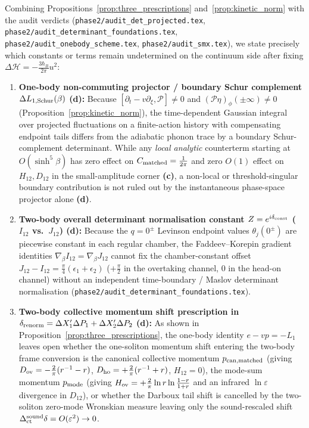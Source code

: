 \documentclass[11pt,a4paper]{article}
\newcommand{\Lc}{\textbf{(c)}}
\newcommand{\Ld}{\textbf{(d)}}
\begin{document}
Combining Propositions~\ref{prop:three_prescriptions} and~\ref{prop:kinetic_norm} with the audit verdicts (\texttt{phase2/audit\_det\_projected.tex}, \texttt{phase2/audit\_determinant\_foundations.tex}, \texttt{phase2/audit\_onebody\_scheme.tex}, \texttt{phase2/audit\_smx.tex}), we state precisely which constants or terms remain undetermined on the continuum side after fixing $\Delta\mathcal{H}=-\frac{3\hbar_B}{2\pi}u^2$:
\begin{enumerate}
\item \textbf{One-body non-commuting projector / boundary Schur complement $\Delta L_{1,\rm Schur}(\beta)$ \Ld:} Because $[\partial_t-v\partial_\xi,\mathcal{P}]\neq 0$ and $(\mathcal{P}\eta)_\phi(\pm\infty)\neq 0$ (Proposition~\ref{prop:kinetic_norm}), the time-dependent Gaussian integral over projected fluctuations on a finite-action history with compensating endpoint tails differs from the adiabatic phonon trace by a boundary Schur-complement determinant. While any \emph{local analytic} counterterm starting at $O(\sinh^5\beta)$ has zero effect on $C_{\rm matched}=\frac{1}{2\pi}$ and zero $O(1)$ effect on $H_{12},D_{12}$ in the small-amplitude corner \Lc, a non-local or threshold-singular boundary contribution is not ruled out by the instantaneous phase-space projector alone \Ld.
\item \textbf{Two-body overall determinant normalisation constant $Z=e^{i\delta_{\rm const}}$ ($I_{12}$ vs.\ $J_{12}$) \Ld:} Because the $q=0^\pm$ Levinson endpoint values $\theta_j(0^\pm)$ are piecewise constant in each regular chamber, the Faddeev--Korepin gradient identities $\nabla_\beta I_{12}=\nabla_\beta J_{12}$ cannot fix the chamber-constant offset $J_{12}-I_{12}=\frac{\pi}{4}(\epsilon_1+\epsilon_2)$ ($+\frac{\pi}{2}$ in the overtaking channel, $0$ in the head-on channel) without an independent time-boundary / Maslov determinant normalisation (\texttt{phase2/audit\_determinant\_foundations.tex}).
\item \textbf{Two-body collective momentum shift prescription in $\delta_{\rm renorm}=\Delta X_1'\Delta P_1+\Delta X_2'\Delta P_2$ \Ld:} As shown in Proposition~\ref{prop:three_prescriptions}, the one-body identity $e-vp=-L_1$ leaves open whether the one-soliton momentum shift entering the two-body frame conversion is the canonical collective momentum $p_{\rm can,matched}$ (giving $D_{\rm ov}=-\frac{2}{\pi}(r^{-1}-r)$, $D_{\rm ho}=+\frac{2}{\pi}(r^{-1}+r)$, $H_{12}=0$), the mode-sum momentum $p_{\rm mode}$ (giving $H_{\rm ov}=+\frac{2}{\pi}\ln r\ln\frac{1-r}{1+r}$ and an infrared $\ln\varepsilon$ divergence in $D_{12}$), or whether the Darboux tail shift is cancelled by the two-soliton zero-mode Wronskian measure leaving only the sound-rescaled shift $\Delta_{\rm ct}^{\rm sound}\delta=O(\varepsilon^2)\to 0$.
\end{enumerate}
\end{document}
